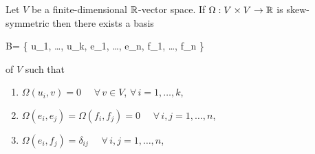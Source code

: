 \documentclass[main.tex]{subfiles}
\begin{document}
\begin{theorem}
\label{th:decomp_th}
	Let $V$ be a finite-dimensional $\mathbb{R}$-vector space. If $\Omega:V\times V\to\mathbb{R}$ is skew-symmetric then there exists a basis
	\begin{eqalign}
		B= \{ u_1, \ldots, u_k, e_1, \ldots, e_n, f_1, \ldots, f_n \}
	\end{eqalign}
	of $V$ such that
	\begin{enumerate}
		\item $\Omega(u_i, v) = 0$ $\quad\forall\,v \in V$, $\forall\,i=1,\dots,k$,
		\item $\Omega(e_i, e_j) = \Omega(f_i, f_j) = 0$  $\quad\forall\,i, j=1,\dots,n$,
		\item $\Omega(e_i, f_j) = \delta_{ij}$ $\quad\forall\,i, j=1,\dots,n$,
	\end{enumerate}
\end{theorem}
\end{document}
